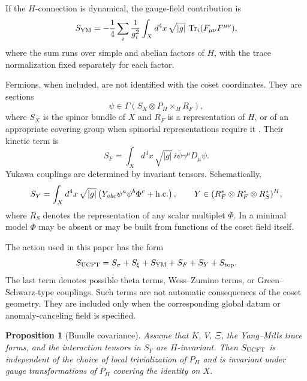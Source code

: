 \documentclass[aps,prd,preprint,longbibliography,nofootinbib,superscriptaddress,floatfix]{revtex4-2}
\newtheorem{proposition}[theorem]{Proposition}
\newcommand{\Tr}{\operatorname{Tr}}
\begin{document}
If the \(H\)-connection is dynamical, the gauge-field contribution is
\begin{equation}
    S_{\rm YM}
    =
    -\frac14
    \sum_i
    \frac{1}{g_i^2}
    \int_X d^4x\,\sqrt{|g|}
    \,
    \Tr_i(F_{\mu\nu}F^{\mu\nu}),
    \label{eq:ucft_yang_mills_action}
\end{equation}
where the sum runs over simple and abelian factors of \(H\), with the trace
normalization fixed separately for each factor.

Fermions, when included, are not identified with the coset coordinates. They
are sections
\begin{equation}
    \psi
    \in
    \Gamma(S_X\otimes P_H\times_H R_F),
    \label{eq:ucft_fermion_bundle}
\end{equation}
where \(S_X\) is the spinor bundle of \(X\) and \(R_F\) is a representation of
\(H\), or of an appropriate covering group when spinorial representations
require it \cite{LawsonMichelsohn,Nakahara}. Their kinetic term is
\begin{equation}
    S_F
    =
    \int_X d^4x\,\sqrt{|g|}
    \,
    i\bar\psi\gamma^\mu D_\mu\psi .
    \label{eq:ucft_fermion_action}
\end{equation}
Yukawa couplings are determined by invariant tensors. Schematically,
\begin{equation}
    S_Y
    =
    \int_X d^4x\,\sqrt{|g|}
    \left(
    Y_{abc}\psi^a\psi^b\Phi^c
    +{\rm h.c.}
    \right),
    \qquad
    Y\in(R_F^\ast\otimes R_F^\ast\otimes R_S^\ast)^H ,
    \label{eq:ucft_yukawa_action}
\end{equation}
where \(R_S\) denotes the representation of any scalar multiplet \(\Phi\). In a
minimal model \(\Phi\) may be absent or may be built from functions of the
coset field itself.

The action used in this paper has the form
\begin{equation}
    S_{\rm UCFT}
    =
    S_\sigma
    +
    S_\xi
    +
    S_{\rm YM}
    +
    S_F
    +
    S_Y
    +
    S_{\rm top}.
    \label{eq:ucft_total_action}
\end{equation}
The last term denotes possible theta terms, Wess--Zumino terms, or
Green--Schwarz-type couplings. Such terms are not automatic consequences of
the coset geometry. They are included only when the corresponding global datum
or anomaly-canceling field is specified.

\begin{proposition}[Bundle covariance]
\label{prop:ucft_bundle_covariance}
Assume that \(K\), \(V\), \(\Xi\), the Yang--Mills trace forms, and the
interaction tensors in \(S_Y\) are \(H\)-invariant. Then \(S_{\rm UCFT}\) is
independent of the choice of local trivialization of \(P_H\) and is invariant
under gauge transformations of \(P_H\) covering the identity on \(X\).
\end{proposition}
\end{document}
